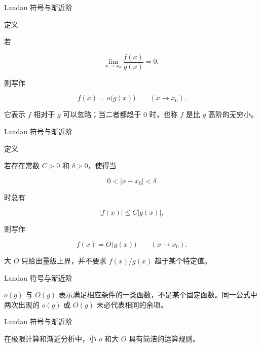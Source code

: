 \documentclass[aspectratio=169,10pt,fontset=fandol]{ctexbeamer}
\begin{document}
\begin{frame}[t,fragile]{Landau 符号与渐近阶}
\normalsize
\begin{block}{定义}
{\normalsize


若

\[

\lim_{x\to x_0}\frac{f(x)}{g(x)}=0,

\]

则写作

\[

f(x)=o\bigl(g(x)\bigr)\qquad(x\to x_0).

\]

它表示 \(f\) 相对于 \(g\) 可以忽略；当二者都趋于 \(0\) 时，也称 \(f\) 是比 \(g\) 高阶的无穷小。


}
\end{block}
\end{frame}
\begin{frame}[t,fragile]{Landau 符号与渐近阶}
\normalsize
\begin{block}{定义}
{\normalsize


若存在常数 \(C>0\) 和 \(\delta>0\)，使得当

\[

0<|x-x_0|<\delta

\]

时总有

\[

|f(x)|\le C|g(x)|,

\]

则写作

\[

f(x)=O\bigl(g(x)\bigr)\qquad(x\to x_0).

\]

大 \(O\) 只给出量级上界，并不要求 \(f(x)/g(x)\) 趋于某个特定值。


}
\end{block}
\end{frame}
\begin{frame}[t,fragile]{Landau 符号与渐近阶}
\normalsize
{\normalsize
\(o(g)\) 与 \(O(g)\) 表示满足相应条件的一类函数，不是某个固定函数。同一公式中两次出现的 \(o(g)\) 或 \(O(g)\) 未必代表相同的余项。


}
\end{frame}
\begin{frame}[t,fragile]{Landau 符号与渐近阶}
\normalsize
{\normalsize




在极限计算和渐近分析中，小 \(o\) 和大 \(O\) 具有简洁的运算规则。




}
\end{frame}
\end{document}

